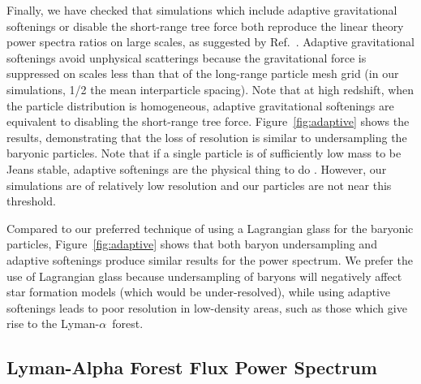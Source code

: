 \documentclass[a4paper,11pt]{article}
\newcommand{\Lya}{Lyman-$\alpha$}
\begin{document}
Finally, we have checked that simulations which include adaptive gravitational softenings or disable the short-range tree force both reproduce the linear theory power spectra ratios on large scales, as suggested by Ref.~\cite{Angulo:2013}. Adaptive gravitational softenings avoid unphysical scatterings because the gravitational force is suppressed on scales less than that of the long-range particle mesh grid (in our simulations, 1/2 the mean interparticle spacing). Note that at high redshift, when the particle distribution is homogeneous, adaptive gravitational softenings are equivalent to disabling the short-range tree force.
Figure~\ref{fig:adaptive} shows the results, demonstrating that the loss of resolution is similar to undersampling the baryonic particles. Note that if a single particle is of sufficiently low mass to be Jeans stable, adaptive softenings are the physical thing to do \cite{Fire2:2018}. However, our simulations are of relatively low resolution and our particles are not near this threshold.

Compared to our preferred technique of using a Lagrangian glass for the baryonic particles, Figure~\ref{fig:adaptive} shows that both baryon undersampling and adaptive softenings produce similar results for the power spectrum. We prefer the use of Lagrangian glass because undersampling of baryons will negatively affect star formation models (which would be under-resolved), while using adaptive softenings leads to poor resolution in low-density areas, such as those which give rise to the \Lya~forest.

\subsection{Lyman-Alpha Forest Flux Power Spectrum}
\label{sec:lymanalpha}

\end{document}
